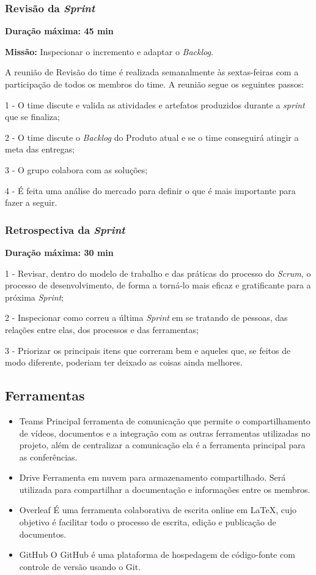\subsubsection{Revisão da \textit{Sprint}}
\textbf{Duração máxima: 45 min}

\textbf{Missão:} Inspecionar o incremento e adaptar o \textit{Backlog}.

A reunião de Revisão do time é realizada semanalmente às sextas-feiras com a participação de todos os membros do time. A reunião segue os seguintes passos:

1 - O time discute e valida as atividades e artefatos produzidos durante a  \textit{sprint} que se finaliza;

2 - O time discute o \textit{Backlog} do Produto atual e se o time conseguirá atingir a meta das entregas;

3 - O grupo colabora com as soluções;

4 - É feita uma análise do mercado para definir o que é mais importante para fazer a seguir.


\subsubsection{Retrospectiva da \textit{Sprint}}
\textbf{Duração máxima: 30 min}


1 - Revisar, dentro do modelo de trabalho e das práticas do processo do  \textit{Scrum}, o processo de desenvolvimento, de forma a torná-lo mais eficaz e gratificante para a próxima \textit{Sprint};

2 - Inspecionar como correu a última \textit{Sprint} em se tratando de pessoas, das relações entre elas, dos processos e das ferramentas;

3 - Priorizar os principais itens que correram bem e aqueles que, se feitos de modo diferente, poderiam ter deixado as coisas ainda melhores.


\subsection{Ferramentas}
\begin{itemize}
    \item Teams
        \subitem Principal ferramenta de comunicação que permite o compartilhamento de vídeos, documentos e a integração com as outras ferramentas utilizadas no projeto, além de centralizar a comunicação ela é a ferramenta principal para as conferências.
    \item Drive
        \subsubitem Ferramenta em nuvem para armazenamento compartilhado. Será utilizada para compartilhar a documentação e informações entre os membros.
    \item Overleaf
        \subsubitem É uma ferramenta colaborativa de escrita online em LaTeX, cujo objetivo é facilitar todo o processo de escrita, edição e publicação de documentos.
    \item GitHub
        \subsubitem O GitHub é uma plataforma de hospedagem de código-fonte com controle de versão usando o Git.
\end{itemize} 